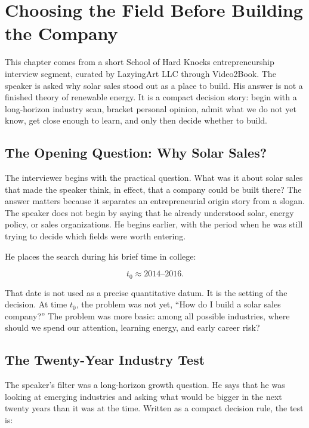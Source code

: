 \chapter{Choosing the Field Before Building the Company}

This chapter comes from a short School of Hard Knocks entrepreneurship interview segment, curated by LazyingArt LLC through Video2Book. The speaker is asked why solar sales stood out as a place to build. His answer is not a finished theory of renewable energy. It is a compact decision story: begin with a long-horizon industry scan, bracket personal opinion, admit what we do not yet know, get close enough to learn, and only then decide whether to build.

\section{The Opening Question: Why Solar Sales?}

The interviewer begins with the practical question. What was it about solar sales that made the speaker think, in effect, that a company could be built there? The answer matters because it separates an entrepreneurial origin story from a slogan. The speaker does not begin by saying that he already understood solar, energy policy, or sales organizations. He begins earlier, with the period when he was still trying to decide which fields were worth entering.

He places the search during his brief time in college:

\begin{equation}
t_0 \approx 2014\text{--}2016.
\end{equation}

That date is not used as a precise quantitative datum. It is the setting of the decision. At time \(t_0\), the problem was not yet, ``How do I build a solar sales company?'' The problem was more basic: among all possible industries, where should we spend our attention, learning energy, and early career risk?

\section{The Twenty-Year Industry Test}

The speaker's filter was a long-horizon growth question. He says that he was looking at emerging industries and asking what would be bigger in the next twenty years than it was at the time. Written as a compact decision rule, the test is:

